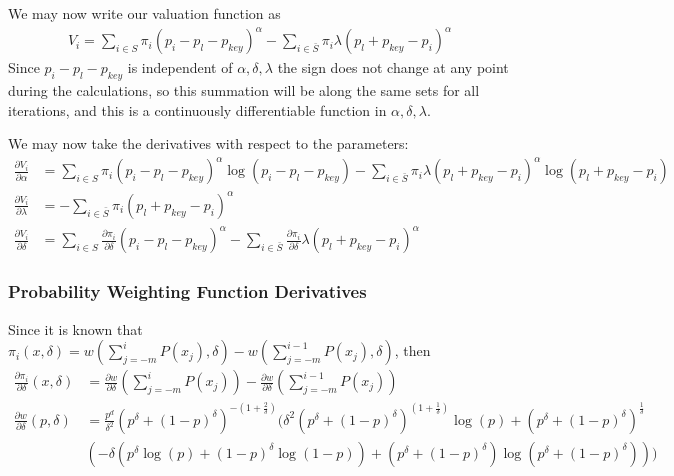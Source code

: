 \documentclass[12pt, letterpaper]{paper}
\begin{document}
We may now write our valuation function as 
\begin{align}
\label{diffValuation}
V_i = \sum_{i \in S} \pi_i (p_i - p_l - p_{key})^\alpha - \sum_{i \in \bar{S}} \pi_i  \lambda ( p_l + p_{key} - p_i )^\alpha
\end{align}
Since $p_i - p_l - p_{key}$ is independent of $\alpha,\delta,\lambda$ the sign does not
change at any point during the calculations, so this summation will be
along the same sets for all iterations, and this is a continuously
differentiable function in $\alpha,\delta,\lambda$. 

We may now take the derivatives with respect to the parameters:
\begin{align*}
\frac{\partial V_i}{\partial \alpha} &= \sum_{i \in S} \pi_i (p_i - p_l - p_{key} )^\alpha \log( p_i - p_l - p_{key}) - \sum_{i \in \bar{S}} \pi_i  \lambda ( p_l + p_{key} - p_i )^\alpha \log( p_l + p_{key} - p_i)\\
\frac{\partial V_i}{\partial \lambda} &=  - \sum_{i \in \bar{S}} \pi_i  ( p_l + p_{key} - p_i )^\alpha \\
\frac{\partial V_i}{\partial \delta} &= \sum_{i \in S} \frac{\partial \pi_i}{\partial \delta} (p_i - p_l - p_{key})^\alpha - \sum_{i \in \bar{S}} \frac{ \partial \pi_i}{\partial \delta}  \lambda ( p_l + p_{key} - p_i )^\alpha 
\end{align*}

\subsubsection{Probability Weighting Function Derivatives}
\label{sec-4-3-3}

Since it is known that $\pi_i (x,\delta) = w( \sum_{j = -m}^i P(x_j), \delta) - w( \sum_{j=-m}^{i-1} P(x_j), \delta )$, then 
\begin{align*}
\frac{\partial \pi_i}{\partial \delta}(x,\delta) &= \frac{\partial w}{\partial \delta} ( \sum_{j = -m}^i P(x_j) ) - \frac{\partial w}{\partial \delta} ( \sum_{j=-m}^{i-1} P(x_j) )\\
\frac{ \partial w}{\partial \delta} (p,\delta) &= \frac{p^{d}}{\delta^{2}} \left(p^{\delta} + \left(1 - p \right)^{\delta}\right)^{- (1 + \frac{2}{\delta})} \Bigg ( \delta^{2} \left(p^{\delta} + \left(1 - p \right)^{\delta}\right)^{ \left(1 + \frac{1}{\delta}\right)} \log{\left (p \right )} + \left(p^{\delta} + \left( 1 - p \right)^{\delta}\right)^{\frac{1}{\delta}} \\
& \left(- \delta \left(p^{\delta} \log{\left (p \right )} + \left( 1 - p \right)^{\delta} \log{\left (1 - p \right )}\right) + \left(p^{\delta} + \left(1 - p \right)^{\delta}\right) \log{\left (p^{\delta} + \left( 1 - p \right)^{\delta} \right )}\right) \Bigg )\\
\end{align*}
\end{document}
